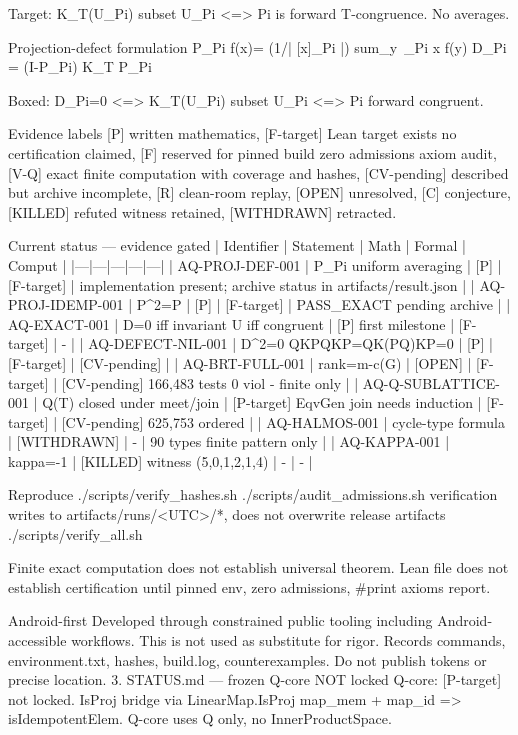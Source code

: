 Target: K_T(U_Pi) subset U_Pi <=> Pi is forward T-congruence. No averages.

Projection-defect formulation
P_Pi f(x)= (1/| [x]_Pi |) sum_{y~_Pi x} f(y)
D_Pi = (I-P_Pi) K_T P_Pi

Boxed: D_Pi=0 <=> K_T(U_Pi) subset U_Pi <=> Pi forward congruent.

Evidence labels
[P] written mathematics, [F-target] Lean target exists no certification claimed, [F] reserved for pinned build zero admissions axiom audit, [V-Q] exact finite computation with coverage and hashes, [CV-pending] described but archive incomplete, [R] clean-room replay, [OPEN] unresolved, [C] conjecture, [KILLED] refuted witness retained, [WITHDRAWN] retracted.

Current status — evidence gated
| Identifier | Statement | Math | Formal | Comput |
|---|---|---|---|---|
| AQ-PROJ-DEF-001 | P_Pi uniform averaging | [P] | [F-target] | implementation present; archive status in artifacts/result.json |
| AQ-PROJ-IDEMP-001 | P^2=P | [P] | [F-target] | PASS_EXACT pending archive |
| AQ-EXACT-001 | D=0 iff invariant U iff congruent | [P] first milestone | [F-target] | - |
| AQ-DEFECT-NIL-001 | D^2=0 QKPQKP=QK(PQ)KP=0 | [P] | [F-target] | [CV-pending] |
| AQ-BRT-FULL-001 | rank=m-c(G) | [OPEN] | [F-target] | [CV-pending] 166,483 tests 0 viol - finite only |
| AQ-Q-SUBLATTICE-001 | Q(T) closed under meet/join | [P-target] EqvGen join needs induction | [F-target] | [CV-pending] 625,753 ordered |
| AQ-HALMOS-001 | cycle-type formula | [WITHDRAWN] | - | 90 types finite pattern only |
| AQ-KAPPA-001 | kappa=-1 | [KILLED] witness (5,0,1,2,1,4) | - | - |

Reproduce
./scripts/verify_hashes.sh
./scripts/audit_admissions.sh
verification writes to artifacts/runs/<UTC>/*, does not overwrite release artifacts
./scripts/verify_all.sh

Finite exact computation does not establish universal theorem. Lean file does not establish certification until pinned env, zero admissions, #print axioms report.

Android-first
Developed through constrained public tooling including Android-accessible workflows. This is not used as substitute for rigor. Records commands, environment.txt, hashes, build.log, counterexamples. Do not publish tokens or precise location.
3. STATUS.md — frozen Q-core NOT locked
Q-core: [P-target] not locked. IsProj bridge via LinearMap.IsProj map_mem + map_id => isIdempotentElem. Q-core uses Q only, no InnerProductSpace.

